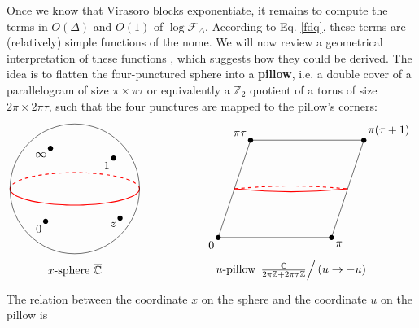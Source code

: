 \documentclass[12pt, a4paper]{article}
\newcommand{\myindex}[1]{\textbf{\boldmath #1}}
\theoremstyle{break}
\begin{document}
Once we know that Virasoro blocks exponentiate, it remains to compute the terms in $O(\Delta)$ and $O(1)$ of $\log \mathcal{F}_\Delta$. According to Eq. \eqref{fdq}, these terms are (relatively) simple functions of the nome. We will now review a geometrical interpretation of these functions \cite{msz15}, which suggests how they could be derived. The idea is to flatten the four-punctured sphere into a \myindex{pillow}, i.e. a double cover of a parallelogram of size $\pi\times \pi \tau$ or equivalently a $\mathbb{Z}_2$ quotient of a torus of size $2\pi\times 2\pi\tau$, such that the four punctures are mapped to the pillow's corners:
\begin{align}
 \begin{tikzpicture}[scale = .5, baseline=(base)]
 \coordinate (base) at (0, 0);
  \draw [thick, red] plot [domain = 0:-180, smooth] ({4*cos(\x)}, {sin(\x)});
  \draw [thick, red, dashed] plot [domain = 0:180, smooth] ({4*cos(\x)}, {sin(\x)});
  \draw (0, 0) circle [radius = 4];
  \draw (-1.8,-2) node [fill, circle, minimum size = 1.6mm, inner sep = 0]{} node[below left] {$0$};
  \draw (2.8, -1.8) node [fill, circle, minimum size = 1.6mm, inner sep = 0]{} node[below left] {$z$};
  \draw (-1.5, 2.5) node [fill, circle, minimum size = 1.6mm, inner sep = 0]{} node[below left] {$\infty$};
  \draw (2.4, 1.9) node [fill, circle, minimum size = 1.6mm, inner sep = 0]{} node[below left] {$1$};
  \draw (0, -5) node {$x$-sphere $\overline{\mathbb{C}}$};
 \end{tikzpicture}
 \hspace{2cm}
 \begin{tikzpicture}[scale = .5, baseline=(base)]
 \coordinate (base) at (0, 0);
  \draw [thick, red] (-3, 0) to [out = -5, in = -175] (4, 0);
   \draw [thick, red, dashed] (-3, 0) to [out = 5, in = 175] (4, 0);
  \draw (-4, -3) node [below left] {$0$} node [fill, circle, minimum size = 1.6mm, inner sep = 0]{} -- (-2,3) node [above left] {$\pi\tau$} node [fill, circle, minimum size = 1.6mm, inner sep = 0]{} -- (5, 3) node [above right] {$\pi(\tau +1)$} node [fill, circle, minimum size = 1.6mm, inner sep = 0]{} -- (3, -3) node [below right] {$\pi$} node [fill, circle, minimum size = 1.6mm, inner sep = 0]{} -- cycle; 
  \draw (.5, -5) node {$u$-pillow $\left. \frac{\mathbb{C}}{2\pi\mathbb{Z}+2\pi\tau\mathbb{Z}}\right/\left(u\to -u\right)$};
 \end{tikzpicture}
 \label{fig:pillow}
\end{align}
The relation between the coordinate $x$ on the sphere and the coordinate $u$ on the pillow is 
\end{document}
